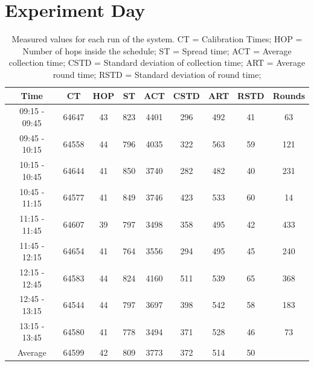 \section{Experiment Day}
\begin{table}[htbp]
 \caption{Measured values for each run of the system. CT = Calibration Times; HOP = Number of hops inside the schedule; ST = Spread time; ACT = Average collection time; CSTD = Standard deviation of collection time; ART = Average round time; RSTD = Standard deviation of round time;}
 \centering
 \begin{tabular}{c||c|c|c|c|c|c|c|c}
  Time & CT & HOP & ST & ACT & CSTD & ART & RSTD & Rounds\\ \toprule
  09:15 - 09:45 & 64647 & 43 & 823 & 4401 & 296 & 492 & 41 & 63\\ 
  09:45 - 10:15 & 64558 & 44 & 796 & 4035 & 322 & 563 & 59 & 121\\
  10:15 - 10:45 & 64644 & 41 & 850 & 3740 & 282 & 482 & 40 & 231\\
  10:45 - 11:15 & 64577 & 41 & 849 & 3746 & 423 & 533 & 60 & 14\\ 
  11:15 - 11:45 & 64607 & 39 & 797 & 3498 & 358 & 495 & 42 & 433\\
  11:45 - 12:15 & 64654 & 41 & 764 & 3556 & 294 & 495 & 45 & 240\\
  12:15 - 12:45 & 64583 & 44 & 824 & 4160 & 511 & 539 & 65 & 368\\
  12:45 - 13:15 & 64544 & 44 & 797 & 3697 & 398 & 542 & 58 & 183\\
  13:15 - 13:45 & 64580 & 41 & 778 & 3494 & 371 & 528 & 46 & 73\\ \toprule
  Average & 64599 & 42 & 809 & 3773 & 372 & 514 & 50 & \\
 \end{tabular}
 \label{tab:NightTable}
\end{table}

